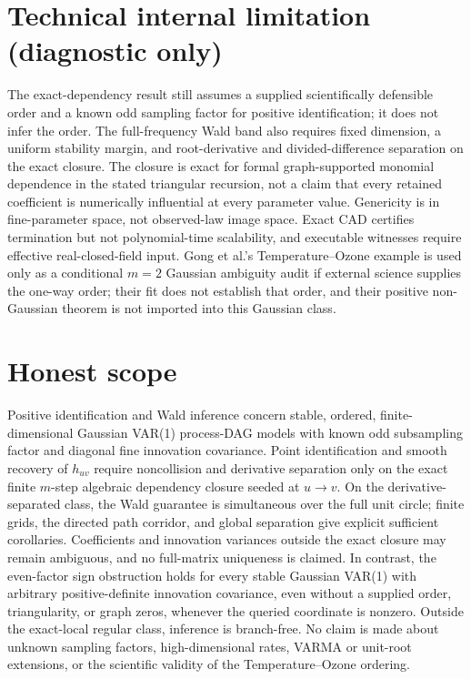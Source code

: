 \documentclass{article}
\begin{document}
\section*{Technical internal limitation (diagnostic only)}

The exact-dependency result still assumes a supplied scientifically defensible order and a known odd sampling factor for positive identification; it does not infer the order.  The full-frequency Wald band also requires fixed dimension, a uniform stability margin, and root-derivative and divided-difference separation on the exact closure.  The closure is exact for formal graph-supported monomial dependence in the stated triangular recursion, not a claim that every retained coefficient is numerically influential at every parameter value.  Genericity is in fine-parameter space, not observed-law image space.  Exact CAD certifies termination but not polynomial-time scalability, and executable witnesses require effective real-closed-field input.  Gong et al.'s Temperature--Ozone example is used only as a conditional \(m=2\) Gaussian ambiguity audit if external science supplies the one-way order; their fit does not establish that order, and their positive non-Gaussian theorem is not imported into this Gaussian class.

\section{Honest scope}

Positive identification and Wald inference concern stable, ordered, finite-dimensional Gaussian VAR(1) process-DAG models with known odd subsampling factor and diagonal fine innovation covariance.  Point identification and smooth recovery of \(h_{uv}\) require noncollision and derivative separation only on the exact finite \(m\)-step algebraic dependency closure seeded at \(u\to v\).  On the derivative-separated class, the Wald guarantee is simultaneous over the full unit circle; finite grids, the directed path corridor, and global separation give explicit sufficient corollaries.  Coefficients and innovation variances outside the exact closure may remain ambiguous, and no full-matrix uniqueness is claimed.  In contrast, the even-factor sign obstruction holds for every stable Gaussian VAR(1) with arbitrary positive-definite innovation covariance, even without a supplied order, triangularity, or graph zeros, whenever the queried coordinate is nonzero.  Outside the exact-local regular class, inference is branch-free.  No claim is made about unknown sampling factors, high-dimensional rates, VARMA or unit-root extensions, or the scientific validity of the Temperature--Ozone ordering.
\end{document}
